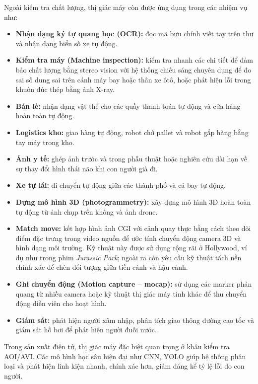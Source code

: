 Ngoài kiểm tra chất lượng, thị giác máy còn được ứng dụng trong các nhiệm vụ như:
\begin{itemize}
    \item \textbf{Nhận dạng ký tự quang học (OCR):} đọc mã bưu chính viết tay trên thư và nhận dạng biển số xe tự động.
    \item \textbf{Kiểm tra máy (Machine inspection):} kiểm tra nhanh các chi tiết để đảm bảo chất lượng bằng stereo vision với hệ thống chiếu sáng chuyên dụng để đo sai số dung sai trên cánh máy bay hoặc thân xe ôtô, hoặc phát hiện lỗi trong khuôn đúc thép bằng ảnh X-ray.
    \item \textbf{Bán lẻ:} nhận dạng vật thể cho các quầy thanh toán tự động và cửa hàng hoàn toàn tự động.
    \item \textbf{Logistics kho:} giao hàng tự động, robot chở pallet và robot gắp hàng bằng tay máy trong kho.
    \item \textbf{Ảnh y tế:} ghép ảnh trước và trong phẫu thuật hoặc nghiên cứu dài hạn về sự thay đổi hình thái não khi con người già đi.
    \item \textbf{Xe tự lái:} di chuyển tự động giữa các thành phố và cả bay tự động.
    \item \textbf{Dựng mô hình 3D (photogrammetry):} xây dựng mô hình 3D hoàn toàn tự động từ ảnh chụp trên không và ảnh drone.
    \item \textbf{Match move:} kết hợp hình ảnh CGI với cảnh quay thực bằng cách theo dõi điểm đặc trưng trong video nguồn để ước tính chuyển động camera 3D và hình dạng môi trường. Kỹ thuật này được sử dụng rộng rãi ở Hollywood, ví dụ như trong phim \textit{Jurassic Park}; ngoài ra còn yêu cầu kỹ thuật tách nền chính xác để chèn đối tượng giữa tiền cảnh và hậu cảnh.
    \item \textbf{Ghi chuyển động (Motion capture – mocap):} sử dụng các marker phản quang từ nhiều camera hoặc kỹ thuật thị giác máy tính khác để thu chuyển động diễn viên cho hoạt hình.
    \item \textbf{Giám sát:} phát hiện người xâm nhập, phân tích giao thông đường cao tốc và giám sát hồ bơi để phát hiện người đuối nước.
\end{itemize}


Trong sản xuất điện tử, thị giác máy đặc biệt quan trọng ở khâu kiểm tra AOI/AVI. Các mô hình học sâu hiện đại như CNN, YOLO giúp hệ thống phân loại và phát hiện linh kiện nhanh, chính xác hơn, giảm đáng kể tỷ lệ lỗi do con người.
